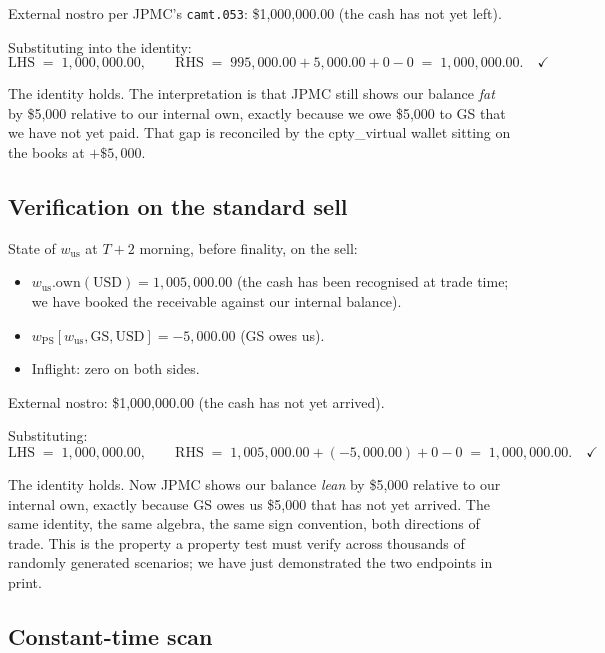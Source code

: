 \documentclass[11pt,a4paper]{article}
\begin{document}
External nostro per JPMC's \texttt{camt.053}: \$1{,}000{,}000.00 (the cash has not yet left).

Substituting into the identity:
\[
\mathrm{LHS} \;=\; 1{,}000{,}000.00, \qquad \mathrm{RHS} \;=\; 995{,}000.00 + 5{,}000.00 + 0 - 0 \;=\; 1{,}000{,}000.00. \quad \checkmark
\]

The identity holds. The interpretation is that JPMC still shows our balance \emph{fat} by \$5{,}000 relative to our internal $\mathrm{own}$, exactly because we owe \$5{,}000 to GS that we have not yet paid. That gap is reconciled by the cpty\_virtual wallet sitting on the books at $+\$5{,}000$.

\subsection{Verification on the standard sell}

State of $w_{\mathrm{us}}$ at $T+2$ morning, before finality, on the sell:
\begin{itemize}[nosep]
\item $w_{\mathrm{us}}.\mathrm{own}(\mathrm{USD}) = 1{,}005{,}000.00$ (the cash has been recognised at trade time; we have booked the receivable against our internal balance).
\item $w_{\mathrm{PS}}[w_{\mathrm{us}}, \mathrm{GS}, \mathrm{USD}] = -5{,}000.00$ (GS owes us).
\item Inflight: zero on both sides.
\end{itemize}

External nostro: \$1{,}000{,}000.00 (the cash has not yet arrived).

Substituting:
\[
\mathrm{LHS} \;=\; 1{,}000{,}000.00, \qquad \mathrm{RHS} \;=\; 1{,}005{,}000.00 + (-5{,}000.00) + 0 - 0 \;=\; 1{,}000{,}000.00. \quad \checkmark
\]

The identity holds. Now JPMC shows our balance \emph{lean} by \$5{,}000 relative to our internal $\mathrm{own}$, exactly because GS owes us \$5{,}000 that has not yet arrived. The same identity, the same algebra, the same sign convention, both directions of trade. This is the property a property test must verify across thousands of randomly generated scenarios; we have just demonstrated the two endpoints in print.

\subsection{Constant-time scan}
\label{sec:reconciliation-perf}
\end{document}
